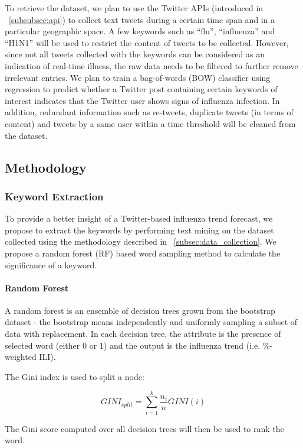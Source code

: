 \documentclass[12pt, oneside]{article}
\begin{document}
To retrieve the dataset, we plan to use the Twitter APIs (introduced in ~\ref{subsubsec:api}) to collect text tweets during a certain time span and in a particular
geographic space. A few keywords such as ``flu'', ``influenza'' and ``H1N1'' will be used to restrict the content of tweets to be collected.
However, since not all tweets collected with the keywords can be considered as an indication of real-time illness, the raw data needs to be filtered to further
remove irrelevant entries. We plan to train a bag-of-words (BOW) classifier using regression to predict whether a Twitter post containing certain keywords of interest
indicates that the Twitter user shows signs of influenza infection. In addition, redundant information such as re-tweets, duplicate tweets (in terms of content)
and tweets by a same user within a time threshold will be cleaned from the dataset.


\subsection{Methodology}


\subsubsection{Keyword Extraction}
To provide a better insight of a Twitter-based influenza trend forecast, we propose to extract the keywords by performing text mining on the dataset collected
using the methodology described in ~\ref{subsec:data_collection}. We propose a random forest (RF) based word sampling method to calculate the significance of a keyword.

\paragraph{Random Forest}
A random forest is an ensemble of decision trees grown from the bootstrap dataset - the bootstrap means independently and uniformly sampling a subset of data with replacement.
In each decision tree, the attribute is the presence of selected word (either 0 or 1) and the output is the influenza trend (i.e. \%-weighted ILI).

The Gini index is used to split a node:

$$GINI_{split} = \sum_{i=1}^{k}\frac{n_i}{n}GINI(i)$$ 

The Gini score computed over all decision trees will then be used to rank the word.
\end{document}
